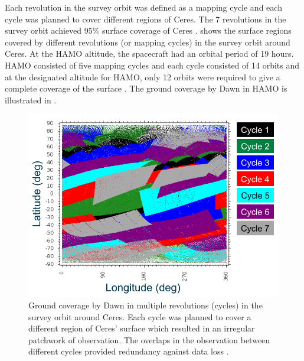 Each revolution in the survey orbit was defined as a mapping cycle and each cycle was planned to cover different regions of Ceres. The 7 revolutions in the survey orbit achieved 95$\%$ surface coverage of Ceres \cite{ceresorbits}.  shows the surface regions covered by different revolutions (or mapping cycles) in the survey orbit around Ceres. At the \gls{HAMO} altitude, the spacecraft had an orbital period of 19 hours. \gls{HAMO} consisted of five mapping cycles and each cycle consisted of 14 orbits and at the designated altitude for \gls{HAMO}, only 12 orbits were required to give a complete coverage of the surface \cite{ceresorbits}. The ground coverage by Dawn in \gls{HAMO} is illustrated in .

\begin{figure}[h]
\begin{minipage}[t]{0.45\linewidth}
\centering
\includegraphics[width=\textwidth]{surveyatceres.png}
\caption{Ground coverage by Dawn in multiple revolutions (cycles) in the survey orbit around Ceres. Each cycle was planned to cover a different region of Ceres' surface which resulted in an irregular patchwork of observation. The overlaps in the observation between different cycles provided redundancy against data loss \cite{ceresorbits}.}
\label{fig:surveyatceres}
\end{minipage}
\hspace{0.5cm}
\begin{minipage}[t]{0.45\linewidth}
\centering

\end{minipage}
\end{figure}
